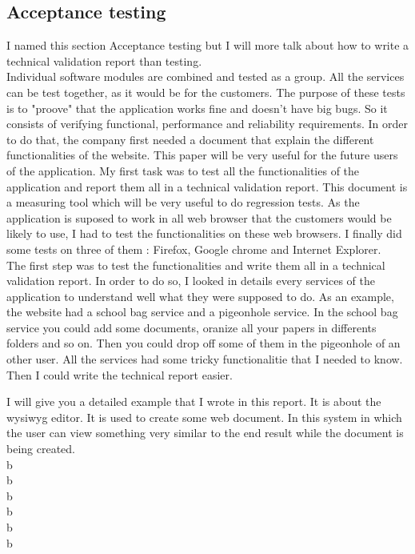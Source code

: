 \newpage
\subsection{Acceptance testing}
I named this section Acceptance testing but I will more talk about how to 
write a technical validation report than testing. \\ 

Individual software modules are combined and tested as a group. All the services can be test
together, as it would be for the customers. 
The purpose of these tests is to "proove" that the application works fine and doesn't have
big bugs. So it consists of verifying functional, performance and reliability requirements. 
In order to do that, the company first needed a document that explain the different 
functionalities of the website. This paper will be very useful for the future users of the 
application.  
My first task was to test all the functionalities of the application and report them all in a technical validation report. This document is a measuring tool
which will be very useful to do regression tests. 
As the application is suposed to work in all web browser that the customers
would be likely to use, I had to test the functionalities on these web
browsers. I finally did some tests on three of them : Firefox, Google chrome and
Internet Explorer. \\ 

The first step was to test the functionalities and write them all in a technical validation
 report. In order to do so, I looked in details every services of the application to 
understand well what they were supposed to do. 
As an example, the website had a school bag service and a pigeonhole service.
In the school bag service you could add some documents, oranize all your papers in
differents folders and so on. Then you could drop off some of them in the pigeonhole of an
other user.
All the services had some tricky functionalitie that I needed to know. Then I could write
the technical report easier. 
   
I will give you a detailed example that I wrote in this report. 
It is about the wysiwyg editor. It is used to create some web document. In this system in 
which the user can view something very 
similar to the end result while the document is being created.  \\ 
b \\
b \\
b \\
b \\
b \\
b \\

